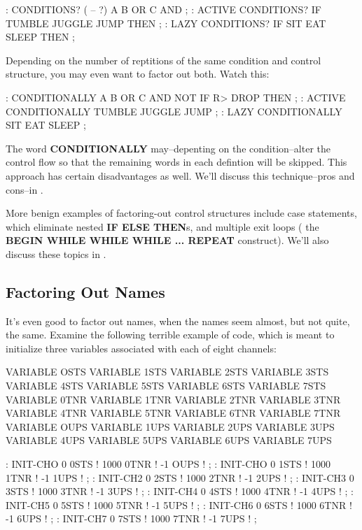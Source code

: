 \begin{Code}
: CONDITIONS? ( -- ?) A B OR C AND ;
: ACTIVE    CONDITIONS? IF TUMBLE JUGGLE JUMP THEN ;
: LAZY      CONDITIONS? IF    SIT  EAT  SLEEP THEN ;
\end{Code}

\noindent 
Depending on the number of reptitions of the same condition and control structure, you may even want to factor out both. Watch this:

\begin{Code}
: CONDITIONALLY   A B OR  C AND NOT IF  R> DROP   THEN ;
: ACTIVE   CONDITIONALLY   TUMBLE JUGGLE JUMP ;
: LAZY   CONDITIONALLY  SIT  EAT  SLEEP ;
\end{Code}

\noindent 
The word \textbf{CONDITIONALLY} may--depenting on the condition--alter the control flow so that the remaining words in each defintion will be skipped. This approach has certain disadvantages as well. We'll discuss this technique--pros and cons--in .

More benign examples of factoring-out control structures include case statements, which eliminate nested \textbf{IF ELSE THEN}s, and multiple exit loops ( the \textbf{BEGIN WHILE WHILE WHILE ... REPEAT} construct). We'll also discuss these topics in .

\subsection{{Factoring Out Names}}
It's even good to factor out names, when the names seem almost, but not quite, the same. Examine the following terrible example of code, which is meant to initialize three variables associated with each of eight channels:

\begin{Code}
VARIABLE OSTS       VARIABLE 1STS       VARIABLE 2STS 
VARIABLE 3STS       VARIABLE 4STS       VARIABLE 5STS
VARIABLE 6STS       VARIABLE 7STS       VARIABLE 0TNR
VARIABLE 1TNR       VARIABLE 2TNR       VARIABLE 3TNR
VARIABLE 4TNR       VARIABLE 5TNR       VARIABLE 6TNR
VARIABLE 7TNR       VARIABLE OUPS       VARIABLE 1UPS
VARIABLE 2UPS       VARIABLE 3UPS       VARIABLE 4UPS
VARIABLE 5UPS       VARIABLE 6UPS       VARIABLE 7UPS
\end{Code}

\begin{Code} 
: INIT-CHO   0 0STS !  1000 0TNR !  -1 OUPS ! ; 
: INIT-CHO   0 1STS !  1000 1TNR !  -1 1UPS ! ; 
: INIT-CH2   0 2STS !  1000 2TNR !  -1 2UPS ! ; 
: INIT-CH3   0 3STS !  1000 3TNR !  -1 3UPS ! ; 
: INIT-CH4   0 4STS !  1000 4TNR !  -1 4UPS ! ; 
: INIT-CH5   0 5STS !  1000 5TNR !  -1 5UPS ! ; 
: INIT-CH6   0 6STS !  1000 6TNR !  -1 6UPS ! ; 
: INIT-CH7   0 7STS !  1000 7TNR !  -1 7UPS ! ; 
\end{Code}

